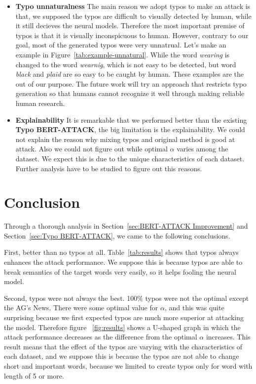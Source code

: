 \documentclass[11pt,a4paper]{article}
\begin{document}
\begin{itemize}
    \item \textbf{Typo unnaturalness} The main reason we adopt typos to make an attack is that, we supposed the typos are difficult to visually detected by human, while it still decieves the neural models. Therefore the most important premise of typos is that it is visually inconspicuous to human. However, contrary to our goal, most of the generated typos were very unnatrual. Let's make an example in Figure~\ref{tab:example-unnatural}. While the word \textit{wearing} is changed to the word \textit{wearnig}, which is not easy to be detected, but word \textit{black} and \textit{plaid} are so easy to be caught by human. These examples are the out of our purpose. The future work will try an approach that restricts typo generation so that humans cannot recognize it well through making reliable human research.
    \item \textbf{Explainability} It is remarkable that we performed better than the existing \textbf{Typo BERT-ATTACK}, the big limitation is the explainability. We could not explain the reason why mixing typos and original method is good at attack. Also we could not figure out while optimal $\alpha$ varies among the dataset. We expect this is due to the unique characteristics of each dataset. Further analysis have to be studied to figure out this reasons.
\end{itemize}

\section{Conclusion}
Through a thorough analysis in Section~\ref{sec:BERT-ATTACK Improvement} and Section~\ref{sec:Typo BERT-ATTACK}, we came to the following conclusions.

First, better than no typos at all. Table~\ref{tab:results} shows that typos always enhances the attack performance. We suppose this is because typos are able to break semantics of the target words very easily, so it helps fooling the neural model. 

Second, typos were not always the best. 100\% typos were not the optimal except the AG's News. There were some optimal value for $\alpha$, and this was quite surprising because we first expected typos are much more superior at attacking the model. Therefore figure ~\ref{fig:results} shows a U-shaped graph in which the attack performance decreases as the difference from the optimal $\alpha$ increases. This result means that the effect of the typos are varying with the characteristics of each dataset, and we suppose this is because the typos are not able to change short and important words, because we limited to create typos only for word with length of 5 or more. 
\end{document}
